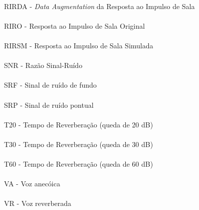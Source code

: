 \paragraph{}RIRDA - \textit{Data Augmentation} da Resposta ao Impulso de Sala
\paragraph{}RIRO - Resposta ao Impulso de Sala Original
\paragraph{}RIRSM - Resposta ao Impulso de Sala Simulada
\paragraph{}SNR - Razão Sinal-Ruído
\paragraph{}SRF - Sinal de ruído de fundo
\paragraph{}SRP - Sinal de ruído pontual
\paragraph{}T20 - Tempo de Reverberação (queda de 20 dB)
\paragraph{}T30 - Tempo de Reverberação (queda de 30 dB)
\paragraph{}T60 - Tempo de Reverberação (queda de 60 dB)
\paragraph{}VA - Voz anecóica
\paragraph{}VR - Voz reverberada


\pagebreak







